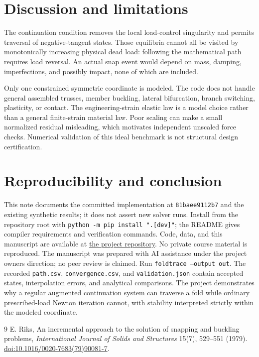 \documentclass[10pt,a4paper]{article}
\begin{document}
\section{Discussion and limitations}
The continuation condition removes the local load-control singularity and permits traversal of negative-tangent states. Those equilibria cannot all be visited by monotonically increasing physical dead load: following the mathematical path requires load reversal. An actual snap event would depend on mass, damping, imperfections, and possibly impact, none of which are included.

Only one constrained symmetric coordinate is modeled. The code does not handle general assembled trusses, member buckling, lateral bifurcation, branch switching, plasticity, or contact. The engineering-strain elastic law is a model choice rather than a general finite-strain material law. Poor scaling can make a small normalized residual misleading, which motivates independent unscaled force checks. Numerical validation of this ideal benchmark is not structural design certification.
\section{Reproducibility and conclusion}
This note documents the committed implementation at \texttt{81baee9112b7} and the existing synthetic results; it does not assert new solver runs. Install from the repository root with \texttt{python -m pip install ".[dev]"}; the README gives compiler requirements and verification commands. Code, data, and this manuscript are available at \href{https://github.com/racostacme-come/foldtrace}{the project repository}. No private course material is reproduced. The manuscript was prepared with AI assistance under the project owner\textquotesingle s direction; no peer review is claimed.
Run \texttt{foldtrace --output out}. The recorded \texttt{path.csv}, \texttt{convergence.csv}, and \texttt{validation.json} contain accepted states, interpolation errors, and analytical comparisons. The project demonstrates why a regular augmented continuation system can traverse a fold while ordinary prescribed-load Newton iteration cannot, with stability interpreted strictly within the modeled coordinate.
\begin{thebibliography}{9}
 E. Riks, An incremental approach to the solution of snapping and buckling problems, \emph{International Journal of Solids and Structures} 15(7), 529--551 (1979). \href{https://doi.org/10.1016/0020-7683(79)90081-7}{doi:10.1016/0020-7683(79)90081-7}.
\end{thebibliography}
\end{document}
